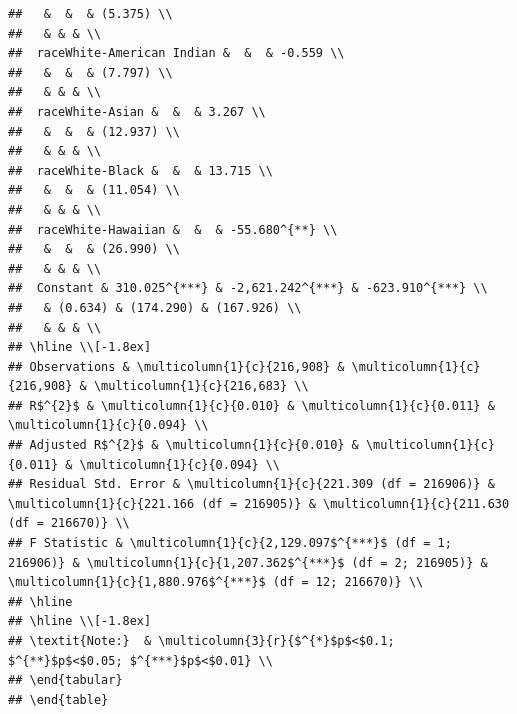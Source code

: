 \documentclass[
]{article}
\begin{document}
\begin{verbatim}
##   &  &  & (5.375) \\ 
##   & & & \\ 
##  raceWhite-American Indian &  &  & -0.559 \\ 
##   &  &  & (7.797) \\ 
##   & & & \\ 
##  raceWhite-Asian &  &  & 3.267 \\ 
##   &  &  & (12.937) \\ 
##   & & & \\ 
##  raceWhite-Black &  &  & 13.715 \\ 
##   &  &  & (11.054) \\ 
##   & & & \\ 
##  raceWhite-Hawaiian &  &  & -55.680^{**} \\ 
##   &  &  & (26.990) \\ 
##   & & & \\ 
##  Constant & 310.025^{***} & -2,621.242^{***} & -623.910^{***} \\ 
##   & (0.634) & (174.290) & (167.926) \\ 
##   & & & \\ 
## \hline \\[-1.8ex] 
## Observations & \multicolumn{1}{c}{216,908} & \multicolumn{1}{c}{216,908} & \multicolumn{1}{c}{216,683} \\ 
## R$^{2}$ & \multicolumn{1}{c}{0.010} & \multicolumn{1}{c}{0.011} & \multicolumn{1}{c}{0.094} \\ 
## Adjusted R$^{2}$ & \multicolumn{1}{c}{0.010} & \multicolumn{1}{c}{0.011} & \multicolumn{1}{c}{0.094} \\ 
## Residual Std. Error & \multicolumn{1}{c}{221.309 (df = 216906)} & \multicolumn{1}{c}{221.166 (df = 216905)} & \multicolumn{1}{c}{211.630 (df = 216670)} \\ 
## F Statistic & \multicolumn{1}{c}{2,129.097$^{***}$ (df = 1; 216906)} & \multicolumn{1}{c}{1,207.362$^{***}$ (df = 2; 216905)} & \multicolumn{1}{c}{1,880.976$^{***}$ (df = 12; 216670)} \\ 
## \hline 
## \hline \\[-1.8ex] 
## \textit{Note:}  & \multicolumn{3}{r}{$^{*}$p$<$0.1; $^{**}$p$<$0.05; $^{***}$p$<$0.01} \\ 
## \end{tabular} 
## \end{table}
\end{verbatim}
\end{document}
